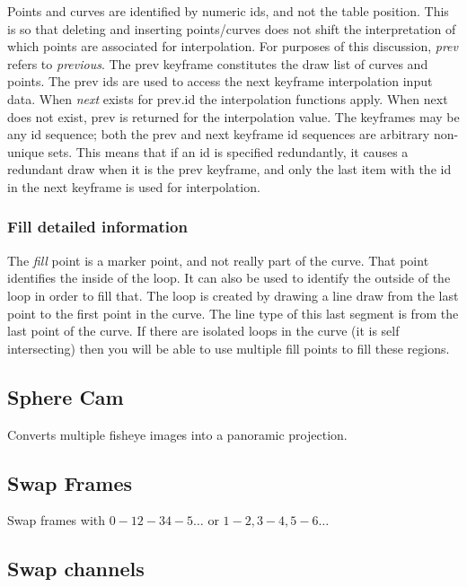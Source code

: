 Points and curves are identified by numeric ids, and not the table position. This is so that deleting and inserting points/curves does not shift the interpretation of which points are associated for interpolation. For purposes of this discussion, \textit{prev} refers to \textit{previous}. The prev keyframe constitutes the draw list of curves and points. The prev ids are used to access the next keyframe interpolation input data. When \textit{next} exists for prev.id the interpolation functions apply. When next does not exist, prev is returned for the interpolation value. The keyframes may be any id sequence; both the prev and next keyframe id sequences are arbitrary non-unique sets. This means that if an id is specified redundantly, it causes a redundant draw when it is the prev keyframe, and only the last item with the id in the next keyframe is used for interpolation.

\subsubsection*{Fill detailed information}%
\label{ssub:fill_detailed_information}

The \textit{fill} point is a marker point, and not really part of the curve. That point identifies the inside of the loop. It can also be used to identify the outside of the loop in order to fill that. The loop is created by drawing a line draw from the last point to the first point in the curve. The line type of this last segment is from the last point of the curve. If there are isolated loops in the curve (it is self intersecting) then you will be able to use multiple fill points to fill these regions.

\subsection{Sphere Cam}%
\label{sub:sphere_cam}

Converts multiple fisheye images into a panoramic projection.

\subsection{Swap Frames}%
\label{sub:swap_frames}

Swap frames with $0-1 2-3 4-5\dots$ or $1-2, 3-4, 5-6\dots$

\subsection{Swap channels}%
\label{sub:swap_channels}

